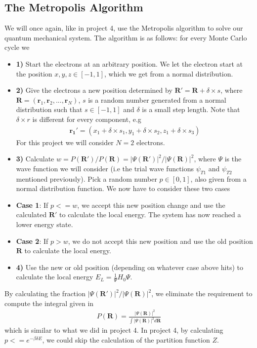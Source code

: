 \documentclass[12pt]{article}
\begin{document}
\subsection{The Metropolis Algorithm}
We will once again, like in project 4, use the Metropolis algorithm to solve our quantum mechanical system. The algorithm is as follows: for every Monte Carlo cycle we 
\begin{itemize}
\item \textbf{1)} Start the electrons at an arbitrary position. We let the electron start at the position $x,y,z \in [-1,1]$, which we get from a normal distribution.

\item \textbf{2)} Give the electrons a new position determined by $\mathbf{R}' = \mathbf{R} + \delta\times s$, where $\mathbf{R} = (\mathbf{r}_1, \mathbf{r}_2, ..., \mathbf{r}_N)$, $s$ is a random number generated from a normal distribution such that $s\in [-1,1]$ and $\delta$ is a small step length. Note that $\delta \times r$ is different for every component, e.g
\begin{align*}
\mathbf{r_1}' = (x_1 + \delta\times s_1, y_1 + \delta\times s_2, z_1 + \delta\times s_3)
\end{align*} For this project we will consider $N=2$ electrons.

\item \textbf{3)} Calculate $w = P(\mathbf{R}')/P(\mathbf{R}) = |\Psi(\mathbf{R}')|^2/|\Psi(\mathbf{R})|^2$, where $\Psi$ is the wave function we will consider (i.e the trial wave functions $\psi_{T1}$ and $\psi_{T2}$ mentioned previously). Pick a random number $p\in [0,1]$, also given from a normal distribution function. We now have to consider these two cases

\item \textbf{Case 1}: If $p <= w$, we accept this new position change and use the calculated $\mathbf{R}'$ to calculate the local energy. The system has now reached a lower energy state.

\item \textbf{Case 2}: If $p > w$, we do not accept this new position and use the old position $\mathbf{R}$ to calculate the local energy.

\item \textbf{4)} Use the new or old position (depending on whatever case above hits) to calculate the local energy $E_L = \frac{1}{\Psi} H_0\Psi$. 
\end{itemize}
By calculating the fraction $|\Psi(\mathbf{R}')|^2/|\Psi(\mathbf{R})|^2$, we eliminate the requirement to compute the integral given in
\begin{align*}
P(\mathbf{R}) = \frac{|\Psi(\mathbf{R})|^2}{\int |\Psi(\mathbf{R})|^2 d\mathbf{R}}
\end{align*}
which is similar to what we did in project 4. In project 4, by calculating $p<= e^{-\beta \delta E}$, we could skip the calculation of the partition function $Z$. 
\end{document}
